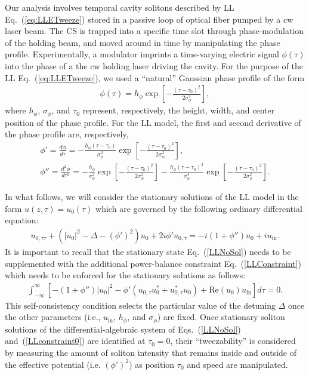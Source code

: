 Our analysis involves temporal cavity solitons described by LL Eq.~(\ref{eq:LLETweeze}) stored in a passive loop of optical fiber pumped by a cw laser beam.  The CS is trapped into a specific time slot through phase-modulation of the holding beam, and moved around in time by manipulating the phase profile.  Experimentally, a modulator imprints a time-varying electric signal $\phi(\tau)$ into the phase of a the cw holding laser driving the cavity.  For the purpose of the LL Eq.~(\ref{eq:LLETweeze}), we used a ``natural'' Gaussian phase profile of the form
\begin{align}
\phi(\tau) = h_{\phi} \exp\left[ -\frac{(\tau - \tau_0)^2}{2 \sigma_{\phi}^2} \right],
\label{phi}
\end{align}
where $h_{\phi}$, $\sigma_{\phi}$, and $\tau_0$ represent, respectively, the height, width, and center position of the phase profile.  For the LL model, the first and second derivative of the phase profile are, respectively, 
\begin{align}
\phi' = \frac{d \phi}{d \tau} = -\frac{h_{\phi} ( \tau - \tau_0)}{\sigma_{\phi}^2} \exp \left[ -\frac{(\tau - \tau_0)^2}{2 \sigma_{\phi}^2}  \right]\label{firstphi}, \\
\phi'' = \frac{d^2 \phi}{d \tau^2} = -\frac{h_{\phi} }{\sigma_{\phi}^2} \exp \left[ -\frac{(\tau - \tau_0)^2}{2 \sigma_{\phi}^2}  \right] -\frac{h_{\phi} ( \tau - \tau_0)^2}{\sigma_{\phi}^4} \exp \left[ -\frac{(\tau - \tau_0)^2}{2 \sigma_{\phi}^2}  \right]. \label{secondphi} 
\end{align}

In what follows, we will consider the stationary solutions of the LL model in the form $u(z, \tau) = u_0(\tau)$ which are governed by the following ordinary differential equation:
\begin{align}
 u_{0,\tau\tau}  + \left( |u_0|^2 -\Delta -  (\phi')^2 \right) u_0 + 2 i \phi' u_{0, \tau}=  - i (1+\phi'')  u_0 + i u_{\mathrm{in}}.
\label{LLNoSol}
\end{align}
It is important to recall that the stationary state Eq.~(\ref{LLNoSol}) needs to be supplemented with the additional power-balance constraint Eq.~(\ref{LLConstraint}) which needs to be enforced for the stationary solutions as follows:
\begin{align}
\int_{-\infty}^{\infty} \left [ - (1 + \phi'') |u_0|^2 - \phi' \left( u_{0,\tau} u_0^* + u_{0,\tau}^*u_0 \right) + \mathrm{Re}(u_0) u_{\mathrm{in}} \right ] d \tau = 0.
\label{LLconstraint0}
\end{align}
This self-consistency condition selects the particular value of the detuning $\Delta$ once the other parameters (i.e., $u_{\mathrm{in}}$, $h_{\phi}$, and $\sigma_{\phi}$) are fixed.  Once stationary soliton solutions of the differential-algebraic system of Eqs.~(\ref{LLNoSol}) and~(\ref{LLconstraint0}) are identified at $\tau_0 = 0$, their ``tweezability'' is considered by measuring the amount of soliton intensity that remains inside and outside of the effective potential (i.e. $(\phi')^2$) as position $\tau_0$ and speed are manipulated.

